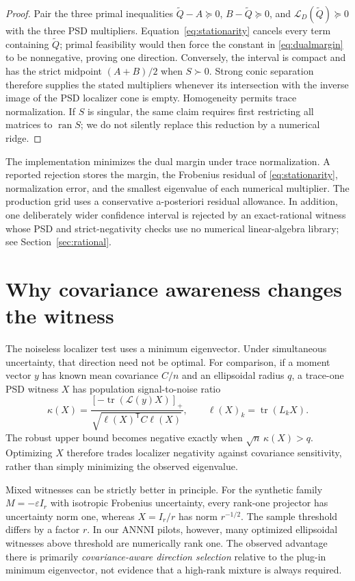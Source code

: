\documentclass[11pt]{article}
\newcommand{\tr}{\operatorname{tr}}
\begin{document}
\begin{proof}
Pair the three primal inequalities
$\widetilde Q-A\succeq0$, $B-\widetilde Q\succeq0$, and
$\mathcal L_D(\widetilde Q)\succeq0$ with the three PSD multipliers.
Equation~\eqref{eq:stationarity} cancels every term containing
$\widetilde Q$; primal feasibility would then force the constant in
\eqref{eq:dualmargin} to be nonnegative, proving one direction.  Conversely,
the interval is compact and has the strict midpoint $(A+B)/2$ when $S\succ0$.
Strong conic separation therefore supplies the stated multipliers whenever its
intersection with the inverse image of the PSD localizer cone is empty.
Homogeneity permits trace normalization.  If $S$ is singular, the same claim
requires first restricting all matrices to $\operatorname{ran}S$; we do not
silently replace this reduction by a numerical ridge.
\end{proof}

The implementation minimizes the dual margin under trace normalization.  A
reported rejection stores the margin, the Frobenius residual of
\eqref{eq:stationarity}, normalization error, and the smallest eigenvalue of
each numerical multiplier.  The production grid uses a conservative
a-posteriori residual allowance.  In addition, one deliberately wider
confidence interval is rejected by an exact-rational witness whose PSD and
strict-negativity checks use no numerical linear-algebra library; see
Section~\ref{sec:rational}.

\section{Why covariance awareness changes the witness}

The noiseless localizer test uses a minimum eigenvector.  Under simultaneous
uncertainty, that direction need not be optimal.  For comparison, if a moment
vector $y$ has known mean covariance $C/n$ and an ellipsoidal radius $q$, a
trace-one PSD witness $X$ has population signal-to-noise ratio
\begin{equation}
 \kappa(X)=\frac{[-\tr(\mathcal L(y)X)]_+}
 {\sqrt{\ell(X)^{\mathsf T}C\ell(X)}},
 \qquad \ell(X)_k=\tr(L_kX).
 \label{eq:snr}
\end{equation}
The robust upper bound becomes negative exactly when
$\sqrt n\,\kappa(X)>q$.  Optimizing $X$ therefore trades localizer negativity
against covariance sensitivity, rather than simply minimizing the observed
eigenvalue.

Mixed witnesses can be strictly better in principle.  For the synthetic family
$M=-\varepsilon I_r$ with isotropic Frobenius uncertainty, every rank-one
projector has uncertainty norm one, whereas $X=I_r/r$ has norm $r^{-1/2}$.
The sample threshold differs by a factor $r$.  In our ANNNI pilots, however,
many optimized ellipsoidal witnesses above threshold are numerically rank one.
The observed advantage there is primarily \emph{covariance-aware direction
selection} relative to the plug-in minimum eigenvector, not evidence that a
high-rank mixture is always required.
\end{document}
